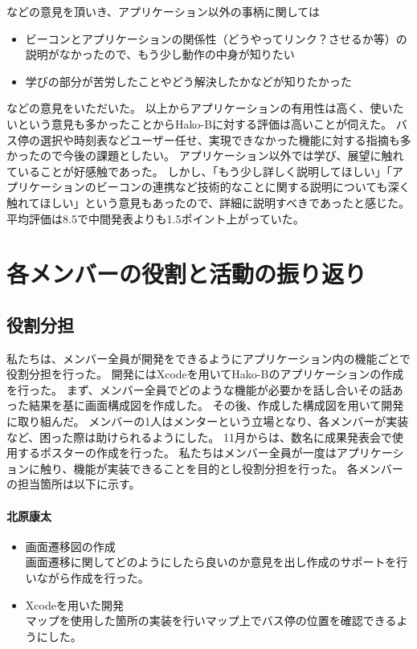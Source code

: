 \documentclass[openany,11pt,papersize]{jsbook}
\begin{document}
などの意見を頂いき、アプリケーション以外の事柄に関しては
\begin{itemize}

\item ビーコンとアプリケーションの関係性（どうやってリンク？させるか等）の説明がなかったので、もう少し動作の中身が知りたい
\item 学びの部分が苦労したことやどう解決したかなどが知りたかった

\end{itemize}
などの意見をいただいた。
以上からアプリケーションの有用性は高く、使いたいという意見も多かったことからHako-Bに対する評価は高いことが伺えた。
バス停の選択や時刻表などユーザー任せ、実現できなかった機能に対する指摘も多かったので今後の課題としたい。
アプリケーション以外では学び、展望に触れていることが好感触であった。
しかし、「もう少し詳しく説明してほしい」「アプリケーションのビーコンの連携など技術的なことに関する説明についても深く触れてほしい」という意見もあったので、詳細に説明すべきであったと感じた。
平均評価は8.5で中間発表よりも1.5ポイント上がっていた。



\chapter{各メンバーの役割と活動の振り返り}
\section{役割分担}
私たちは、メンバー全員が開発をできるようにアプリケーション内の機能ごとで役割分担を行った。
開発にはXcodeを用いてHako-Bのアプリケーションの作成を行った。
まず、メンバー全員でどのような機能が必要かを話し合いその話あった結果を基に画面構成図を作成した。
その後、作成した構成図を用いて開発に取り組んだ。
メンバーの1人はメンターという立場となり、各メンバーが実装など、困った際は助けられるようにした。
11月からは、数名に成果発表会で使用するポスターの作成を行った。
私たちはメンバー全員が一度はアプリケーションに触り、機能が実装できることを目的とし役割分担を行った。
各メンバーの担当箇所は以下に示す。

\subsubsection{北原康太}
\begin{itemize}
  \item 画面遷移図の作成\\
    画面遷移に関してどのようにしたら良いのか意見を出し作成のサポートを行いながら作成を行った。
	\item Xcodeを用いた開発\\
    マップを使用した箇所の実装を行いマップ上でバス停の位置を確認できるようにした。
\end{itemize}
\end{document}
